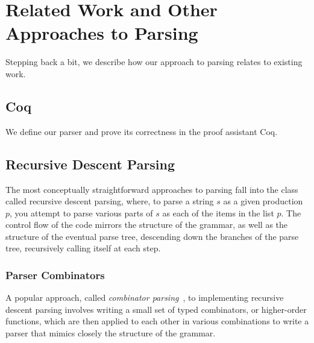 \chapter{Related Work and Other Approaches to Parsing} \label{sec:related}

  Stepping back a bit, we describe how our approach to parsing relates to existing work.
  
  \section{Coq} \label{sec:coq}
    We define our parser and prove its correctness in the proof assistant Coq.  
  
  
  \section{Recursive Descent Parsing}
    The most conceptually straightforward approaches to parsing fall into the class called recursive descent parsing, where, to parse a string $s$ as a given production $p$, you attempt to parse various parts of $s$ as each of the items in the list $p$.  The control flow of the code mirrors the structure of the grammar, as well as the structure of the eventual parse tree, descending down the branches of the parse tree, recursively calling itself at each step.
    
    \subsection{Parser Combinators}
      A popular approach, called \emph{combinator parsing}~\cite{pcomb}, to implementing recursive descent parsing involves writing a small set of typed combinators, or higher-order functions, which are then applied to each other in various combinations to write a parser that mimics closely the structure of the grammar.
      
